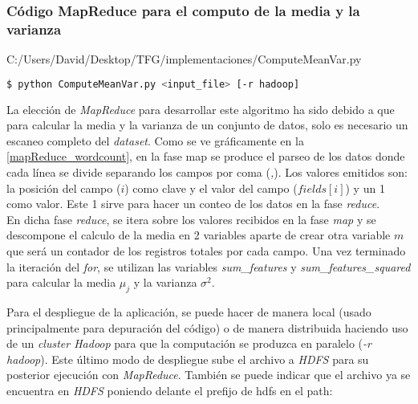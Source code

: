 \newpage  
  
\subsubsection*{Código MapReduce para el computo de la media y la varianza}
  

                {C:/Users/David/Desktop/TFG/implementaciones/ComputeMeanVar.py}

\begin{lstlisting}[language=bash, numbers=none]
$ python ComputeMeanVar.py <input_file> [-r hadoop]
\end{lstlisting}

La elección de \textit{MapReduce} para desarrollar este algoritmo ha sido debido a que para calcular la media y 
la varianza de un conjunto de datos, solo es necesario un escaneo completo del \textit{dataset}. Como se ve
gráficamente en la \autoref{mapReduce_wordcount}, en la fase map se produce el parseo de los datos donde cada línea
se divide separando los campos por coma (\textit{,}). Los valores emitidos son: la posición del campo ($i$) como clave
y el valor del campo ($fields[i]$) y un 1 como valor. Este 1 sirve para hacer un conteo de los datos en la fase 
\textit{reduce}.\\
En dicha fase \textit{reduce}, se itera sobre los valores recibidos en la fase \textit{map} y se descompone el calculo
de la media en 2 variables aparte de crear otra variable $m$ que será un contador de los registros totales por cada campo.
Una vez terminado la iteración del \textit{for}, se utilizan las variables \textit{sum\_features} y 
\textit{sum\_features\_squared} para calcular la media $\mu_j$ y la varianza $\sigma^2$.
\newline

Para el despliegue de la aplicación, se puede hacer de manera local (usado principalmente para depuración del código)
o de manera distribuida haciendo uso de un \textit{cluster Hadoop} para que la computación se produzca en paralelo
(\textit{-r hadoop}). Este último modo de despliegue sube el archivo  a \textit{HDFS} para su 
posterior ejecución con \textit{MapReduce}. También se puede indicar que el archivo ya se encuentra en \textit{HDFS}
poniendo delante el prefijo de hdfs en el path: 
  
\newpage

